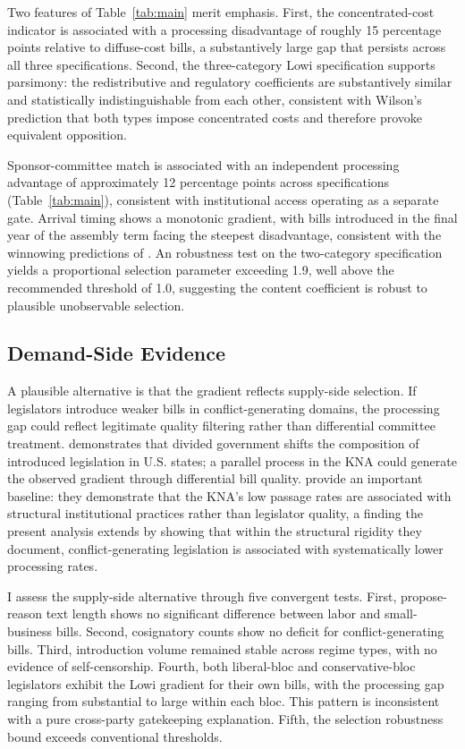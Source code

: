 \documentclass[11pt]{article}
\begin{document}
Two features of Table~\ref{tab:main} merit emphasis. First, the concentrated-cost indicator is associated with a processing disadvantage of roughly 15 percentage points relative to diffuse-cost bills, a substantively large gap that persists across all three specifications. Second, the three-category Lowi specification supports parsimony: the redistributive and regulatory coefficients are substantively similar and statistically indistinguishable from each other, consistent with Wilson's prediction that both types impose concentrated costs and therefore provoke equivalent opposition.

Sponsor-committee match is associated with an independent processing advantage of approximately 12 percentage points across specifications (Table~\ref{tab:main}), consistent with institutional access operating as a separate gate. Arrival timing shows a monotonic gradient, with bills introduced in the final year of the assembly term facing the steepest disadvantage, consistent with the winnowing predictions of \citet{krutz2005}. An \citet{oster2019} robustness test on the two-category specification yields a proportional selection parameter exceeding 1.9, well above the recommended threshold of 1.0, suggesting the content coefficient is robust to plausible unobservable selection.

\subsection{Demand-Side Evidence}

A plausible alternative is that the gradient reflects supply-side selection. If legislators introduce weaker bills in conflict-generating domains, the processing gap could reflect legitimate quality filtering rather than differential committee treatment. \citet{craig2023} demonstrates that divided government shifts the composition of introduced legislation in U.S. states; a parallel process in the KNA could generate the observed gradient through differential bill quality. \citet{kim2026} provide an important baseline: they demonstrate that the KNA's low passage rates are associated with structural institutional practices rather than legislator quality, a finding the present analysis extends by showing that within the structural rigidity they document, conflict-generating legislation is associated with systematically lower processing rates.

I assess the supply-side alternative through five convergent tests. First, propose-reason text length shows no significant difference between labor and small-business bills. Second, cosignatory counts show no deficit for conflict-generating bills. Third, introduction volume remained stable across regime types, with no evidence of self-censorship. Fourth, both liberal-bloc and conservative-bloc legislators exhibit the Lowi gradient for their own bills, with the processing gap ranging from substantial to large within each bloc. This pattern is inconsistent with a pure cross-party gatekeeping explanation. Fifth, the \citet{oster2019} selection robustness bound exceeds conventional thresholds.
\end{document}
